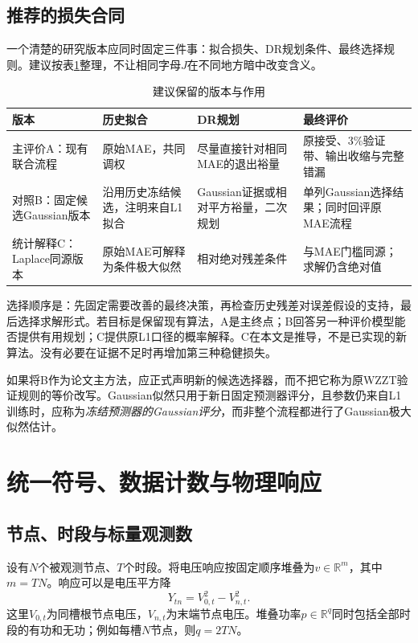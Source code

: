 \documentclass[UTF8,11pt,a4paper,fontset=fandol]{ctexart}
\newcommand{\R}{\mathbb R}
\numberwithin{equation}{section}
\begin{document}
\subsection{推荐的损失合同}
一个清楚的研究版本应同时固定三件事：拟合损失、DR规划条件、最终选择规则。建议按表\ref{tab:versions}整理，不让相同字母$J$在不同地方暗中改变含义。
\begin{table}[htbp]\centering\small
\caption{建议保留的版本与作用}\label{tab:versions}
\begin{tabularx}{\linewidth}{p{27mm}XXX}\toprule
版本&历史拟合&DR规划&最终评价\\\midrule
主评价A：现有联合流程&原始MAE，共同调权&尽量直接针对相同MAE的退出裕量&原接受、3\%验证带、输出收缩与完整错漏\\
对照B：固定候选Gaussian版本&沿用历史冻结候选，注明来自L1拟合&Gaussian证据或相对平方裕量，二次规划&单列Gaussian选择结果；同时回评原MAE流程\\
统计解释C：Laplace同源版本&原始MAE可解释为条件极大似然&相对绝对残差条件&与MAE门槛同源；求解仍含绝对值\\\bottomrule
\end{tabularx}
\end{table}

选择顺序是：先固定需要改善的最终决策，再检查历史残差对误差假设的支持，最后选择求解形式。若目标是保留现有算法，A是主终点；B回答另一种评价模型能否提供有用规划；C提供原L1口径的概率解释。C在本文是推导，不是已实现的新算法。没有必要在证据不足时再增加第三种稳健损失。

如果将B作为论文主方法，应正式声明新的候选选择器，而不把它称为原WZZT验证规则的等价改写。Gaussian似然只用于新日固定预测器评分，且参数仍来自L1训练时，应称为\emph{冻结预测器的Gaussian评分}，而非整个流程都进行了Gaussian极大似然估计。

\section{统一符号、数据计数与物理响应}
\label{sec:notation}
\subsection{节点、时段与标量观测数}
设有$N$个被观测节点、$T$个时段。将电压响应按固定顺序堆叠为$v\in\R^m$，其中$m=TN$。响应可以是电压平方降
\begin{equation}
Y_{tn}=V_{0,t}^2-V_{n,t}^2.
\label{eq:physicalY}
\end{equation}
这里$V_{0,t}$为同槽根节点电压，$V_{n,t}$为末端节点电压。堆叠功率$p\in\R^q$同时包括全部时段的有功和无功；例如每槽$N$节点，则$q=2TN$。
\end{document}
